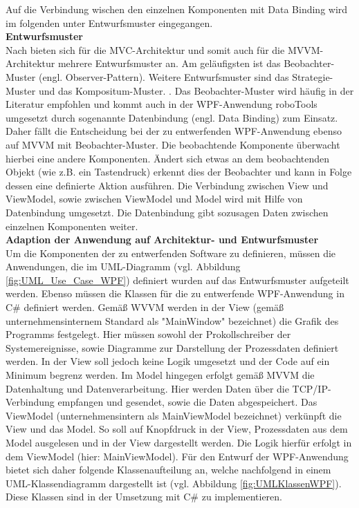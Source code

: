 \documentclass[ a4paper,
                oneside,
                toc=bibliography,
                toc=listof
                ]{scrbook}
\begin{document}
	Auf die Verbindung wischen den einzelnen Komponenten mit Data Binding wird im folgenden unter Entwurfsmuster eingegangen.\\
	\textbf{Entwurfsmuster}\\
	Nach \cite{ArchitekturmusterGoll} bieten sich für die MVC-Architektur und somit auch für die MVVM-Architektur mehrere Entwurfsmuster an. Am geläufigsten ist das Beobachter-Muster (engl. Observer-Pattern). Weitere Entwurfsmuster sind das Strategie-Muster und das Kompositum-Muster. \cite{ArchitekturmusterGoll}. Das Beobachter-Muster wird häufig in der Literatur empfohlen und kommt auch in der WPF-Anwendung roboTools umgesetzt durch sogenannte Datenbindung (engl. Data Binding) zum Einsatz. Daher fällt die Entscheidung bei der zu entwerfenden WPF-Anwendung ebenso auf MVVM mit Beobachter-Muster. Die beobachtende Komponente überwacht hierbei eine andere Komponenten. Ändert sich etwas an dem beobachtenden Objekt (wie z.B. ein Tastendruck) erkennt dies der Beobachter und kann in Folge dessen eine definierte Aktion ausführen. \cite{ArchitekturmusterGoll} Die Verbindung zwischen View und ViewModel, sowie zwischen ViewModel und Model wird mit Hilfe von Datenbindung umgesetzt. Die Datenbindung gibt sozusagen Daten zwischen einzelnen Komponenten weiter.\\
	\textbf{Adaption der Anwendung auf Architektur- und Entwurfsmuster}\\
	Um die Komponenten der zu entwerfenden Software zu definieren, müssen die Anwendungen, die im UML-Diagramm (vgl. Abbildung \ref{fig:UML_Use_Case_WPF}) definiert wurden auf das Entwurfsmuster aufgeteilt werden. Ebenso müssen die Klassen für die zu entwerfende WPF-Anwendung in C\# definiert werden. Gemäß WVVM werden in der View (gemäß unternehmensinternem Standard als "MainWindow" bezeichnet)
	die Grafik des Programms festgelegt. Hier müssen sowohl der Prokollschreiber der Systemereignisse, sowie Diagramme zur Darstellung der Prozessdaten definiert werden. In der View soll jedoch keine Logik umgesetzt und der Code auf ein Minimum begrenz werden. Im Model hingegen erfolgt gemäß MVVM die Datenhaltung und Datenverarbeitung. Hier werden Daten über die TCP/IP-Verbindung empfangen und gesendet, sowie die Daten abgespeichert. Das ViewModel (unternehmensintern als MainViewModel bezeichnet) verkünpft die View und das Model. So soll auf Knopfdruck in der View, Prozessdaten aus dem Model ausgelesen und in der View dargestellt werden. Die Logik hierfür erfolgt in dem ViewModel (hier: MainViewModel). Für den Entwurf der WPF-Anwendung bietet sich daher folgende Klassenaufteilung an, welche nachfolgend in einem UML-Klassendiagramm dargestellt ist (vgl. Abbildung \ref{fig:UMLKlassenWPF}). Diese Klassen sind in der Umsetzung mit C\# zu implementieren.
\end{document}
